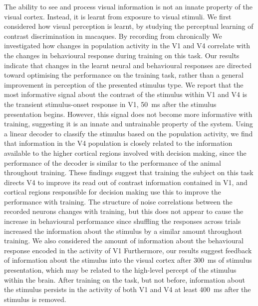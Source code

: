 The ability to see and process visual information is not an innate property of the visual cortex.
Instead, it is learnt from exposure to visual stimuli.
We first considered how visual perception is learnt, by studying the perceptual learning of contrast discrimination in macaques.
By recording from chronically We investigated how changes in population activity in the \acf{V1} and \acs{V4} correlate with the changes in behavioural response during training on this task.
Our results indicate that changes in the learnt neural and behavioural responses are directed toward optimising the performance on the training task, rather than a general improvement in perception of the presented stimulus type.
We report that the most informative signal about the contrast of the stimulus within \ac{V1} and \acs{V4} is the transient stimulus-onset response in \ac{V1}, \SI{50}{\milli\second} after the stimulus presentation begins.
However, this signal does not become more informative with training, suggesting it is an innate and untrainable property of the system.
Using a linear decoder to classify the stimulus based on the population activity, we find that information in the \acs{V4} population is closely related to the information available to the higher cortical regions involved with decision making, since the performance of the decoder is similar to the performance of the animal throughout training.
These findings suggest that training the subject on this task directs \acs{V4} to improve its read out of contrast information contained in \ac{V1}, and cortical regions responsible for decision making use this to improve the performance with training.
The structure of noise correlations between the recorded neurons changes with training, but this does not appear to cause the increase in behavioural performance since shuffling the responses across trials increased the information about the stimulus by a similar amount throughout training.
We also considered the amount of information about the behavioural response encoded in the activity of \ac{V1}
Furthermore, our results suggest feedback of information about the stimulus into the visual cortex after \SI{300}{\milli\second} of stimulus presentation, which may be related to the high-level percept of the stimulus within the brain.
After training on the task, but not before, information about the stimulus persists in the activity of both \ac{V1} and \acs{V4} at least \SI{400}{\milli\second} after the stimulus is removed.

